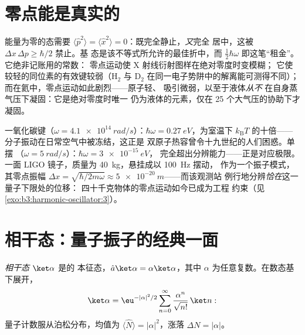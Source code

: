 \section{零点能是真实的}

\begin{remark}[为何能量不能再低]\label{rem:b3:harmonic-oscillator:zeropoint}
能量为零的态需要 $\langle\hat p^2\rangle =
\langle\hat x^2\rangle = 0$：既完全静止，\emph{又}完全
居中，这被 $\Delta x\,\Delta p \ge \hbar/2$ 禁止。基
态是该不等式所允许的最佳折中，而
$\tfrac12\hbar\omega$ 即这笔“租金”。它绝非记账用的常数：
零点运动使 X 射线衍射图样在绝对零度时变模糊；
它使较轻的同位素的有效键较弱（H$_2$ 与
D$_2$ 在同一电子势阱中的解离能可测得不同）；
而在氦中，零点运动如此剧烈——原子轻、
吸引微弱，以至于液体\emph{从不}
在自身蒸气压下凝固：它是绝对零度时唯一
仍为液体的元素，仅在 25 个大气压的协助下才凝固。
\end{remark}

\begin{example}\label{ex:b3:harmonic-oscillator:scales}
一氧化碳键（$\omega = \qty{4.1e14}{rad/s}$）：$\hbar\omega =
\qty{0.27}{eV}$，为室温下 $k_{\text{B}}T$ 的十倍——
分子振动在日常空气中被冻结，这正是
双原子热容曾令十九世纪的人们困惑。单摆
（$\omega = \qty{5}{rad/s}$）：$\hbar\omega = \qty{3e-15}{eV}$，
完全超出分辨能力——正是对应极限。一面 LIGO
镜子，质量为 \qty{40}{kg}，悬挂成以 \qty{100}{Hz} 摆动，
作为一个振子模式，其零点振幅 $\Delta x =
\sqrt{\hbar/2m\omega} \approx \qty{5e-20}{m}$——而该观测站
例行地分辨\emph{恰在}这一量子下限处的位移：
四十千克物体的零点运动如今已成为工程
约束（见\cref{exo:b3:harmonic-oscillator:3}）。
\end{example}

\section{相干态：量子振子的经典一面}

\begin{definition}[相干态]\label{def:b3:harmonic-oscillator:coherent}
\emph{相干态} $\ket\alpha$ 是的
本征态，$\hat a\ket\alpha = \alpha\ket\alpha$，其中
$\alpha$ 为任意复数。在数态基下展开，
\[
\ket\alpha = \eu^{-|\alpha|^2/2}\sum_{n=0}^\infty
\frac{\alpha^n}{\sqrt{n!}}\,\ket n :
\]
量子计数服从泊松分布，均值为 $\langle\hat
N\rangle = |\alpha|^2$，涨落 $\Delta N = |\alpha|$。
\end{definition}


